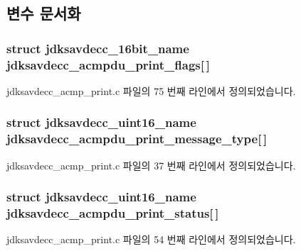 \subsection{변수 문서화}
\subsubsection[{\texorpdfstring{jdksavdecc\+\_\+acmpdu\+\_\+print\+\_\+flags}{jdksavdecc_acmpdu_print_flags}}]{\setlength{\rightskip}{0pt plus 5cm}struct {\bf jdksavdecc\+\_\+16bit\+\_\+name} jdksavdecc\+\_\+acmpdu\+\_\+print\+\_\+flags\mbox{[}$\,$\mbox{]}}\hypertarget{group__acmp__print_gae4346c62b401222d113a73dc5f5f3cfe}{}\label{group__acmp__print_gae4346c62b401222d113a73dc5f5f3cfe}


jdksavdecc\+\_\+acmp\+\_\+print.\+c 파일의 75 번째 라인에서 정의되었습니다.

\subsubsection[{\texorpdfstring{jdksavdecc\+\_\+acmpdu\+\_\+print\+\_\+message\+\_\+type}{jdksavdecc_acmpdu_print_message_type}}]{\setlength{\rightskip}{0pt plus 5cm}struct {\bf jdksavdecc\+\_\+uint16\+\_\+name} jdksavdecc\+\_\+acmpdu\+\_\+print\+\_\+message\+\_\+type\mbox{[}$\,$\mbox{]}}\hypertarget{group__acmp__print_gac8bc1b2ddf5d5788ef9846be06446b2f}{}\label{group__acmp__print_gac8bc1b2ddf5d5788ef9846be06446b2f}


jdksavdecc\+\_\+acmp\+\_\+print.\+c 파일의 37 번째 라인에서 정의되었습니다.

\subsubsection[{\texorpdfstring{jdksavdecc\+\_\+acmpdu\+\_\+print\+\_\+status}{jdksavdecc_acmpdu_print_status}}]{\setlength{\rightskip}{0pt plus 5cm}struct {\bf jdksavdecc\+\_\+uint16\+\_\+name} jdksavdecc\+\_\+acmpdu\+\_\+print\+\_\+status\mbox{[}$\,$\mbox{]}}\hypertarget{group__acmp__print_ga9d62c7c54ab6eb010490acdf16d8c57f}{}\label{group__acmp__print_ga9d62c7c54ab6eb010490acdf16d8c57f}


jdksavdecc\+\_\+acmp\+\_\+print.\+c 파일의 54 번째 라인에서 정의되었습니다.

